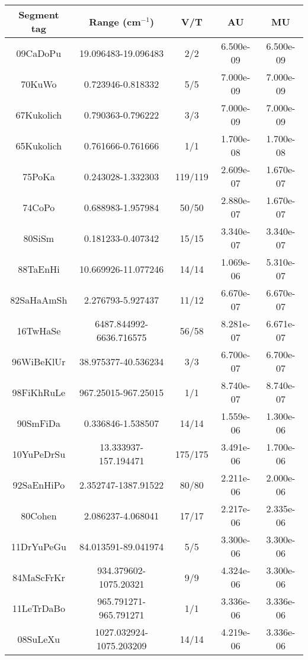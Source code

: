 \begin{longtable}{c c c c c}
\hline
\endhead
Segment tag & Range (cm$^{-1}$) & V/T & AU & MU \\
\hline
09CaDoPu \cite{09CaDoPu} & 19.096483-19.096483 & 2/2 & 6.500e-09 & 6.500e-09 \\
70KuWo \cite{70KuWo} & 0.723946-0.818332 & 5/5 & 7.000e-09 & 7.000e-09 \\
67Kukolich \cite{67Kukolich} & 0.790363-0.796222 & 3/3 & 7.000e-09 & 7.000e-09 \\
65Kukolich \cite{65Kukolich} & 0.761666-0.761666 & 1/1 & 1.700e-08 & 1.700e-08 \\
75PoKa \cite{75PoKa} & 0.243028-1.332303 & 119/119 & 2.609e-07 & 1.670e-07 \\
74CoPo \cite{74CoPo} & 0.688983-1.957984 & 50/50 & 2.880e-07 & 1.670e-07 \\
80SiSm \cite{80SiSm} & 0.181233-0.407342 & 15/15 & 3.340e-07 & 3.340e-07 \\
88TaEnHi \cite{88TaEnHi} & 10.669926-11.077246 & 14/14 & 1.069e-06 & 5.310e-07 \\
82SaHaAmSh \cite{82SaHaAmSh} & 2.276793-5.927437 & 11/12 & 6.670e-07 & 6.670e-07 \\
16TwHaSe \cite{16TwHaSe} & 6487.844992-6636.716575 & 56/58 & 8.281e-07 & 6.671e-07 \\
96WiBeKlUr \cite{96WiBeKlUr} & 38.975377-40.536234 & 3/3 & 6.700e-07 & 6.700e-07 \\
98FiKhRuLe \cite{98FiKhRuLe} & 967.25015-967.25015 & 1/1 & 8.740e-07 & 8.740e-07 \\
90SmFiDa \cite{90SmFiDa} & 0.336846-1.538507 & 14/14 & 1.559e-06 & 1.300e-06 \\
10YuPeDrSu \cite{10YuPeDrSu} & 13.333937-157.194471 & 175/175 & 3.491e-06 & 1.700e-06 \\
92SaEnHiPo \cite{92SaEnHiPo} & 2.352747-1387.91522 & 80/80 & 2.211e-06 & 2.000e-06 \\
80Cohen \cite{80Cohen} & 2.086237-4.068041 & 17/17 & 2.217e-06 & 2.335e-06 \\
11DrYuPeGu \cite{11DrYuPeGu} & 84.013591-89.041974 & 5/5 & 3.300e-06 & 3.300e-06 \\
84MaScFrKr \cite{84MaScFrKr} & 934.379602-1075.20321 & 9/9 & 4.324e-06 & 3.300e-06 \\
11LeTrDaBo \cite{11LeTrDaBo} & 965.791271-965.791271 & 1/1 & 3.336e-06 & 3.336e-06 \\
08SuLeXu \cite{08SuLeXu} & 1027.032924-1075.203209 & 14/14 & 4.219e-06 & 3.336e-06 \\

\end{longtable}
